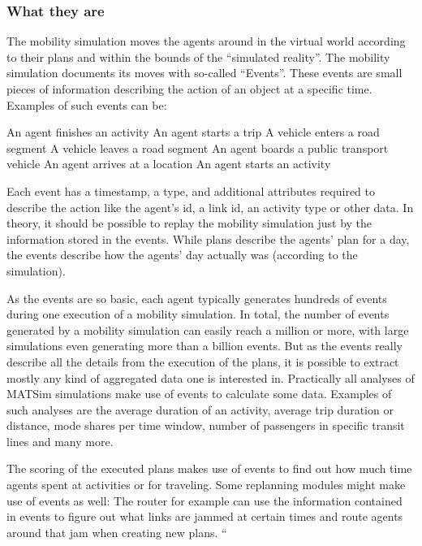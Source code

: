 \subsubsection{What they are}
The mobility simulation moves the agents around in the virtual world according to their plans and within the bounds of the ``simulated reality''. The mobility simulation documents its moves with so-called ``Events''. These events are small pieces of information describing the action of an object at a specific time. Examples of such events can be:

    An agent finishes an activity
    An agent starts a trip
    A vehicle enters a road segment
    A vehicle leaves a road segment
    An agent boards a public transport vehicle
    An agent arrives at a location
    An agent starts an activity

Each event has a timestamp, a type, and additional attributes required to describe the action like the agent's id, a link id, an activity type or other data. In theory, it should be possible to replay the mobility simulation just by the information stored in the events. While plans describe the agents' plan for a day, the events describe how the agents' day actually was (according to the simulation).

As the events are so basic, each agent typically generates hundreds of events during one execution of a mobility simulation. In total, the number of events generated by a mobility simulation can easily reach a million or more, with large simulations even generating more than a billion events. But as the events really describe all the details from the execution of the plans, it is possible to extract mostly any kind of aggregated data one is interested in. Practically all analyses of MATSim simulations make use of events to calculate some data. Examples of such analyses are the average duration of an activity, average trip duration or distance, mode shares per time window, number of passengers in specific transit lines and many more.

The scoring of the executed plans makes use of events to find out how much time agents spent at activities or for traveling. Some replanning modules might make use of events as well: The router for example can use the information contained in events to figure out what links are jammed at certain times and route agents around that jam when creating new plans.
``

